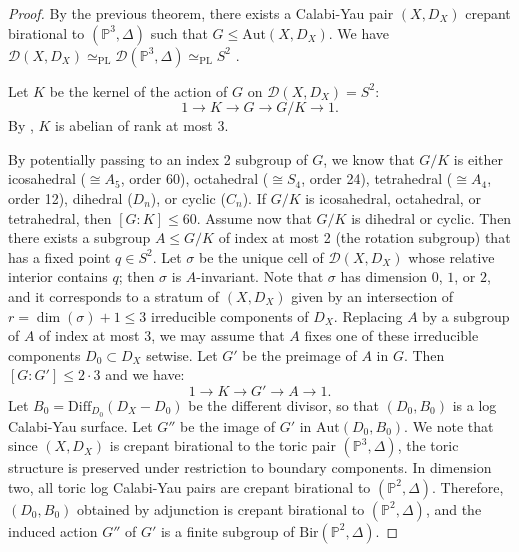 \documentclass[a4paper,12pt,oneside]{amsart}
\numberwithin{equation}{section}
\theoremstyle{definition}
\theoremstyle{remark}
\newcommand{\PP}{\mathbb{P}}
\begin{document}
\begin{proof}
By the previous theorem, there exists a Calabi-Yau pair $(X, D_X)$ crepant birational to $(\PP^3, \Delta)$ such that \( G \leqslant \mathrm{Aut}(X, D_X) \). We have $\mathcal{D}(X, D_X)\simeq_{\mathrm{PL}} \mathcal{D}(\PP^3, \Delta) \simeq_{\mathrm{PL}} S^2$ \cite[Theorem 13]{Koll_r_2015}.

Let \( K \) be the kernel of the action of \( G \) on \( \mathcal{D}(X, D_X) = S^2 \):
\[
1 \longrightarrow K \longrightarrow G \longrightarrow G/K \longrightarrow 1.
\] By \cite[Proposition 2.5.2]{przy}, $K$ is abelian of rank at most 3. 

By potentially passing to an index 2 subgroup of $G$, we know that \( G/K \) is either icosahedral (\( \cong A_5 \), order 60), octahedral (\( \cong S_4 \), order 24), tetrahedral (\( \cong A_4 \), order 12), dihedral (\( D_n \)), or cyclic (\( C_n \)). If \( G/K \) is icosahedral, octahedral, or tetrahedral, then \( [G:K] \leq 60 \). Assume now that \( G/K \) is dihedral or cyclic. Then there exists a subgroup \( A \leqslant G/K \) of index at most 2 (the rotation subgroup) that has a fixed point \( q \in S^2 \). Let $\sigma$ be the unique cell
of $\mathcal D(X,D_X)$ whose relative interior contains $q$; then $\sigma$ is $A$-invariant.
Note that $\sigma$ has dimension $0$, $1$, or $2$, and it corresponds to a stratum of $(X,D_X)$
given by an intersection of $r=\dim(\sigma)+1\le 3$ irreducible components of $D_X$.
Replacing $A$ by a subgroup of $A$ of index at most $3$, we may assume that $A$ fixes one of these
irreducible components $D_0\subset D_X$ setwise. Let \( G' \) be the preimage of \( A \) in \( G \). Then \( [G : G'] \leq 2\cdot 3  \) and we have:
\[
1 \longrightarrow K \longrightarrow G' \longrightarrow A \longrightarrow 1.
\]
Let \( B_0 = \mathrm{Diff}_{D_0}(D_X - D_0) \) be the different divisor, so that \( (D_0, B_0) \) is a log Calabi-Yau surface. Let \( G'' \) be the image of \( G' \) in \( \mathrm{Aut}(D_0, B_0) \). We note that since $(X,D_X)$ is crepant birational to the toric pair $(\mathbb{P}^3,\Delta)$, 
the toric structure is preserved under restriction to boundary components. 
In dimension two, all toric log Calabi-Yau pairs are crepant birational to 
$(\mathbb{P}^2,\Delta)$. Therefore,
$(D_0,B_0)$ obtained by adjunction is crepant birational to 
$(\mathbb{P}^2,\Delta)$, and the induced action $G''$ of $G'$ is a finite subgroup of $\mathrm{Bir}(\mathbb{P}^2,\Delta)$.


\end{proof}
\end{document}
